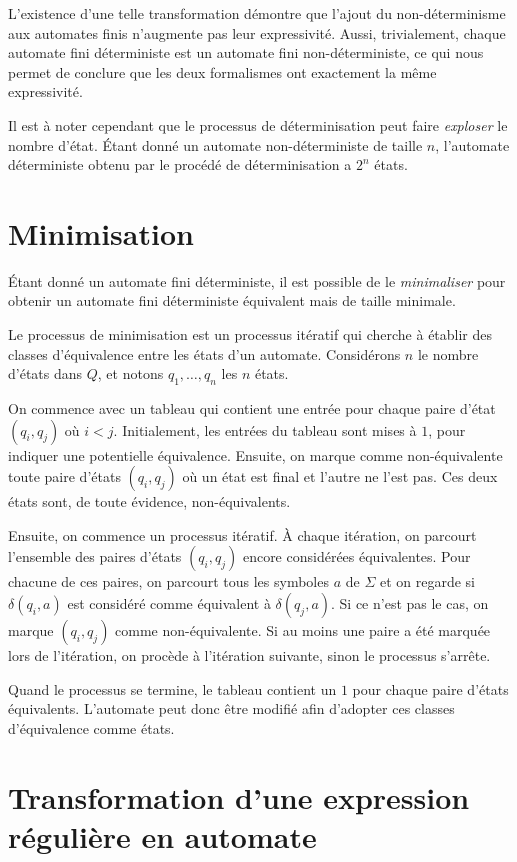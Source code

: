 L'existence d'une telle transformation démontre que l'ajout du non-déterminisme aux automates finis n'augmente pas leur expressivité. Aussi, trivialement, chaque automate fini déterministe est un automate fini non-déterministe, ce qui nous permet de conclure que les deux formalismes ont exactement la même expressivité.

Il est à noter cependant que le processus de déterminisation peut faire \textit{exploser} le nombre d'état.
Étant donné un automate non-déterministe de taille $n$, l'automate déterministe obtenu par le procédé de déterminisation a $2^n$ états.

\section{Minimisation}

Étant donné un automate fini déterministe, il est possible de le \og \textit{minimaliser} \fg{} pour obtenir un automate fini déterministe équivalent mais de taille minimale.

Le processus de minimisation est un processus itératif qui cherche à établir des classes d'équivalence entre les états d'un automate.
Considérons $n$ le nombre d'états dans $Q$, et notons $q_1, \dots, q_n$ les $n$ états.

On commence avec un tableau qui contient une entrée pour chaque paire d'état $(q_i, q_j)$ où $i < j$.
Initialement, les entrées du tableau sont mises à $1$, pour indiquer une potentielle équivalence.
Ensuite, on marque comme non-équivalente toute paire d'états $(q_i, q_j)$ où un état est final et l'autre ne l'est pas.
Ces deux états sont, de toute évidence, non-équivalents.

Ensuite, on commence un processus itératif. À chaque itération, on parcourt l'ensemble des paires d'états $(q_i, q_j)$ encore considérées équivalentes.
Pour chacune de ces paires, on parcourt tous les symboles $a$ de $\Sigma$ et on regarde si $\delta(q_i, a)$ est considéré comme équivalent à $\delta(q_j, a)$.
Si ce n'est pas le cas, on marque $(q_i, q_j)$ comme non-équivalente.
Si au moins une paire a été marquée lors de l'itération, on procède à l'itération suivante, sinon le processus s'arrête.

Quand le processus se termine, le tableau contient un $1$ pour chaque paire d'états équivalents.
L'automate peut donc être modifié afin d'adopter ces classes d'équivalence comme états.

\section{Transformation d'une expression régulière en automate}

